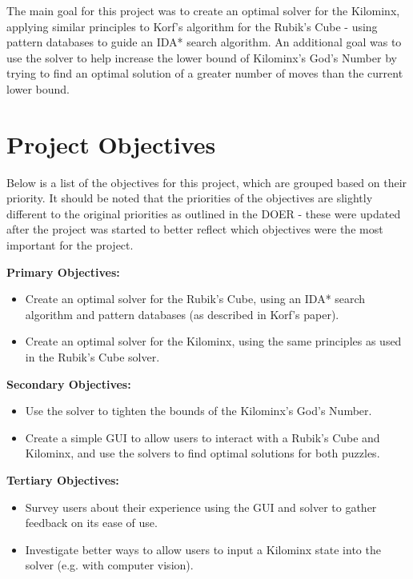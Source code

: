 The main goal for this project was to create an optimal solver for the Kilominx, applying similar principles to Korf's algorithm for the Rubik's Cube -  using pattern databases to guide an IDA* search algorithm. An additional goal was to use the solver to help increase the lower bound of Kilominx's God's Number by trying to find an optimal solution of a greater number of moves than the current lower bound.

\section{Project Objectives}
Below is a list of the objectives for this project, which are grouped based on their priority. It should be noted that the priorities of the objectives are slightly different to the original priorities as outlined in the DOER - these were updated after the project was started to better reflect which objectives were the most important for the project.

\textbf{Primary Objectives:}
\begin{itemize}
    \item Create an optimal solver for the Rubik's Cube, using an IDA* search algorithm and pattern databases (as described in Korf's paper).
    \item Create an optimal solver for the Kilominx, using the same principles as used in the Rubik's Cube solver.
\end{itemize}

\textbf{Secondary Objectives:}
\begin{itemize}
    \item Use the solver to tighten the bounds of the Kilominx's God's Number.
    \item Create a simple GUI to allow users to interact with a Rubik's Cube and Kilominx, and use the solvers to find optimal solutions for both puzzles.
\end{itemize}

\textbf{Tertiary Objectives:}
\begin{itemize}
    \item Survey users about their experience using the GUI and solver to gather feedback on its ease of use.
    \item Investigate better ways to allow users to input a Kilominx state into the solver (e.g. with computer vision).
\end{itemize}